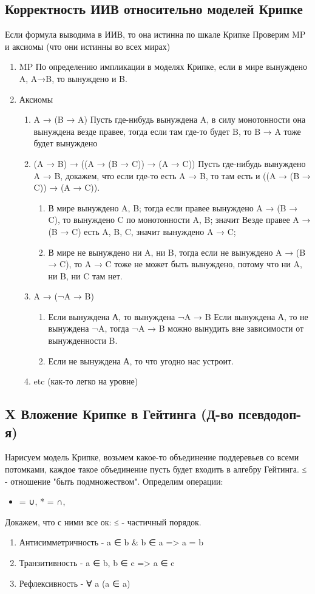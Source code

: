 \documentclass[11pt]{article}
\begin{document}
\subsection{Корректность ИИВ относительно моделей Крипке}
\label{sec-6-2}
Если формула выводима в ИИВ, то она истинна по шкале Крипке
Проверим MP и аксиомы (что они истинны во всех мирах)
\begin{enumerate}
\item MP
По определению импликации в моделях Крипке, если в мире
вынуждено A, A→B, то вынуждено и B.
\item Аксиомы
\begin{enumerate}
\item A → (B → A)
Пусть где-нибудь вынуждена A, в силу
монотонности она вынуждена везде правее, тогда если
там где-то будет B, то B → A тоже будет вынуждено
\item (A → B) → ((A → (B → C)) → (A → C))
Пусть где-нибудь вынуждено A → B, докажем, что если
где-то есть A → B, то там есть и ((A → (B → C)) → (A → C)).
\begin{enumerate}
\item В мире вынуждено A, B; тогда если правее вынуждено
A → (B → C), то вынуждено C по монотонности A, B; значит
Везде правее A → (B → C) есть A, B, C, значит вынуждено A → C;
\item В мире не вынуждено ни A, ни B, тогда если не вынуждено
A → (B → C), то A → C тоже не может быть вынуждено, потому что
ни A, ни B, ни C там нет.
\end{enumerate}
\item A → (¬A → B)
\begin{enumerate}
\item Если вынуждена А, то вынуждена ¬A → B
Если вынуждена А, то не вынуждена ¬A, тогда ¬A → B
можно вынудить вне зависимости от вынужденности B.
\item Если не вынуждена А, то что угодно нас устроит.
\end{enumerate}
\item etc (как-то легко на уровне)
\end{enumerate}
\end{enumerate}
\subsection{{\bfseries\sffamily X} Вложение Крипке в Гейтинга (Д-во псевдодоп-я)}
\label{sec-6-3}
Нарисуем модель Крипке, возьмем какое-то объединение поддеревьев
со всеми потомками, каждое такое объединение пусть будет входить
в алгебру Гейтинга. ≤ - отношение "быть подмножеством".
Определим операции:
\begin{itemize}
\item = ∪, * = ∩,
\end{itemize}
Докажем, что с ними все ок:
≤ - частичный порядок.
\begin{enumerate}
\item Антисимметричность - a ∈ b \& b ∈ a => a = b
\item Транзитивность - a ∈ b, b ∈ c => a ∈ c
\item Рефлексивность - ∀ a (a ∈ a)
\end{enumerate}
\end{document}
